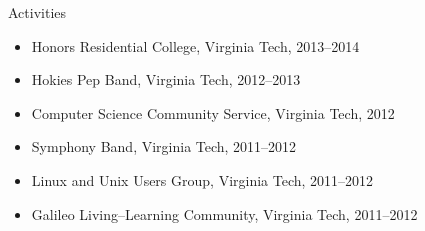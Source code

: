 \documentclass[letter]{article}
\begin{document}
\begin{minipage}{\textwidth}
{\huge Activities }


  \begin{itemize}
    
      \item Honors Residential College, Virginia Tech, 2013--2014
    
      \item Hokies Pep Band, Virginia Tech, 2012--2013
    
      \item Computer Science Community Service, Virginia Tech, 2012
    
      \item Symphony Band, Virginia Tech, 2011--2012
    
      \item Linux and Unix Users Group, Virginia Tech, 2011--2012
    
      \item Galileo Living--Learning Community, Virginia Tech, 2011--2012
    
  \end{itemize}
  \bigskip

\end{minipage}
\end{document}
